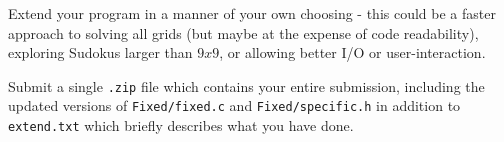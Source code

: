 \begin{exercise}
\label{ex:sudoku3}

Extend your program in a manner of your own choosing - this could be a
faster approach to solving all grids (but maybe at the expense of code
readability), exploring Sudokus larger than $9x9$, or allowing better
I/O or user-interaction.

\noindent Submit a single \verb^.zip^ file which contains your entire
submission, including the updated versions of \verb^Fixed/fixed.c^ and
\verb^Fixed/specific.h^ in addition to \verb^extend.txt^ which briefly
describes what you have done.

\end{exercise}

